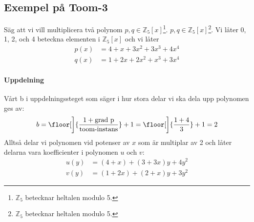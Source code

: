 \subsection{Exempel på Toom-3}
Säg att vi vill multiplicera två polynom $p, q \in \mathbb{Z}_5[x]$\footnote{$\mathbb{Z}_5$ betecknar heltalen modulo 5.}.
$p, q \in \mathbb{Z}_5[x]$\footnote{$\mathbb{Z}_5$ betecknar heltalen modulo 5.}.
Vi låter 0, 1, 2, och 4 beteckna elementen i $\mathbb{Z}_5[x]$ och vi låter
\begin{align*}
  p(x) &= 4+x+3x^2+3x^3+4x^4 \\
  q(x) &= 1+2x+2x^2+x^3+3x^4
\end{align*}

\paragraph{Uppdelning}
Vårt b i uppdelningssteget som säger i hur stora delar vi ska dela upp
polynomen ges av:
\begin{equation*}
  b = \floor[\bigg]{\frac{1 + \mbox{grad p}}{\mbox{toom-instans}}} + 1 = \floor[\bigg]{\frac{1 + 4}{3}} + 1 = 2
\end{equation*}
Alltså delar vi polynomen vid potenser av $x$ som är multiplar av 2 och låter
delarna vara koefficienter i polynomen $u$ och $v$:
\begin{align*}
  u(y) &= (4+x)+(3 + 3x)y+ 4y^2 \\
  v(y) &= (1 + 2x)+ (2 + x)y + 3y^2
\end{align*}

